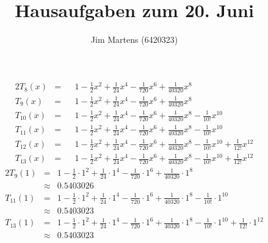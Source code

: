 \documentclass[10pt,a4paper,oneside,ngerman,numbers=noenddot]{scrartcl}
\begin{document}
\author{Jim Martens (6420323)}
\title{Hausaufgaben zum 20. Juni}
\maketitle
\section{} %
\subsection{} %
\begin{alignat*}{2}
T_{8}(x) &=&& 1 - \frac{1}{2}x^{2} + \frac{1}{24}x^{4} - \frac{1}{720}x^{6} + \frac{1}{40320}x^{8} \\
T_{9}(x) &=&& 1 - \frac{1}{2}x^{2} + \frac{1}{24}x^{4} - \frac{1}{720}x^{6} + \frac{1}{40320}x^{8} \\
T_{10}(x) &=&& 1 - \frac{1}{2}x^{2} + \frac{1}{24}x^{4} - \frac{1}{720}x^{6} + \frac{1}{40320}x^{8} - \frac{1}{10!}x^{10}\\
T_{11}(x) &=&& 1 - \frac{1}{2}x^{2} + \frac{1}{24}x^{4} - \frac{1}{720}x^{6} + \frac{1}{40320}x^{8} - \frac{1}{10!}x^{10} \\
T_{12}(x) &=&& 1 - \frac{1}{2}x^{2} + \frac{1}{24}x^{4} - \frac{1}{720}x^{6} + \frac{1}{40320}x^{8} - \frac{1}{10!}x^{10} + \frac{1}{12!}x^{12}\\
T_{13}(x) &=&& 1 - \frac{1}{2}x^{2} + \frac{1}{24}x^{4} - \frac{1}{720}x^{6} + \frac{1}{40320}x^{8} - \frac{1}{10!}x^{10} + \frac{1}{12!}x^{12}
\end{alignat*}
\begin{alignat*}{2}
T_{9}(1) &=& 1 - \frac{1}{2} \cdot 1^{2} + \frac{1}{24} \cdot 1^{4} - \frac{1}{720} \cdot 1^{6} + \frac{1}{40320} \cdot 1^{8} \\
&\approx & 0.5403026  \\
T_{11}(1) &=& 1 - \frac{1}{2} \cdot 1^{2} + \frac{1}{24} \cdot 1^{4} - \frac{1}{720} \cdot 1^{6} + \frac{1}{40320} \cdot 1^{8} - \frac{1}{10!} \cdot 1^{10} \\
&\approx & 0.5403023 \\
T_{13}(1) &=& 1 - \frac{1}{2} \cdot 1^{2} + \frac{1}{24} \cdot 1^{4} - \frac{1}{720} \cdot 1^{6} + \frac{1}{40320} \cdot 1^{8} - \frac{1}{10!} \cdot 1^{10} + \frac{1}{12!} \cdot 1^{12} \\
&\approx & 0.5403023
\end{alignat*}
\end{document}
